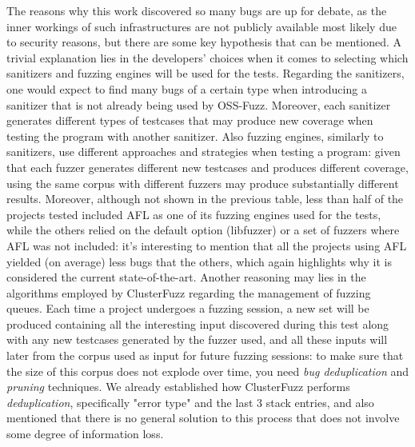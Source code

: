 \newpage
The reasons why this work discovered so many bugs are up for debate, as the inner workings of such infrastructures are not publicly available most likely due to security reasons, but there are some key hypothesis that can be mentioned.
\newline \newline
A trivial explanation lies in the developers' choices when it comes to selecting which sanitizers and fuzzing engines will be used for the tests.
\newline
Regarding the sanitizers, one would expect to find many bugs of a certain type when introducing a sanitizer that is not already being used by OSS-Fuzz. Moreover, each sanitizer generates different types of testcases that may produce new coverage when testing the program with another sanitizer.
\newline
Also fuzzing engines, similarly to sanitizers, use different approaches and strategies when testing a program: given that each fuzzer generates different new testcases and produces different coverage, using the same corpus with different fuzzers may produce substantially different results.
\newline
Moreover, although not shown in the previous table, less than half of the projects tested included AFL as one of its fuzzing engines used for the tests, while the others relied on the default option (libfuzzer) or a set of fuzzers where AFL was not included: it's interesting to mention that all the projects using AFL yielded (on average) less bugs that the others, which again highlights why it is considered the current state-of-the-art.
\newline \newline
Another reasoning may lies in the algorithms employed by ClusterFuzz regarding the management of fuzzing queues.
\newline
Each time a project undergoes a fuzzing session, a new set will be produced containing all the interesting input discovered during this test along with any new testcases generated by the fuzzer used, and all these inputs will later from the corpus used as input for future fuzzing sessions: to make sure that the size of this corpus does not explode over time, you need \textit{bug deduplication} and \textit{pruning} techniques.
\newline
We already established how ClusterFuzz performs \textit{deduplication}, specifically "error type" and the last 3 stack entries, and also mentioned that there is no general solution to this process that does not involve some degree of information loss.
